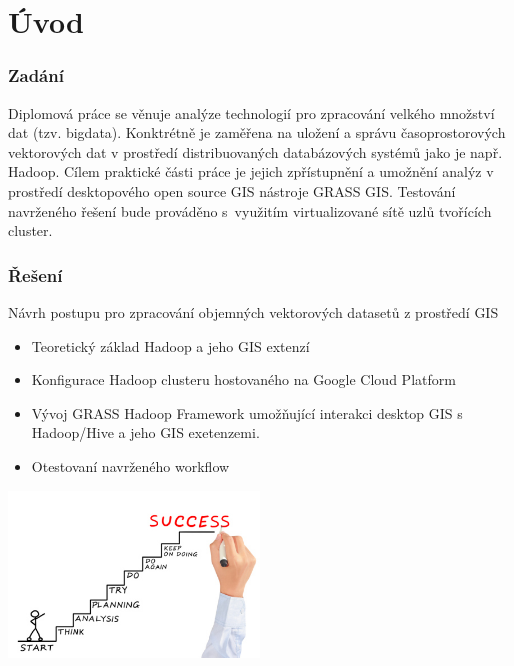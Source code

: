 \documentclass[unicode,bookmarksnumbered]{beamer}
\begin{document}
%

	\section{Úvod}  %
	\begin{frame}
		\frametitle{Zadání}
Diplomová práce se věnuje analýze technologií pro zpracování velkého množství dat (tzv. bigdata). Konktrétně je zaměřena na uložení a správu časoprostorových vektorových dat v prostředí distribuovaných databázových systémů jako je např. Hadoop. Cílem praktické části práce je jejich zpřístupnění a umožnění analýz v prostředí desktopového open source GIS nástroje GRASS GIS. Testování navrženého řešení bude prováděno s využitím virtualizované sítě uzlů tvořících cluster.

	\end{frame}
%

	\begin{frame}
		\frametitle{Řešení}
		Návrh postupu pro zpracování objemných vektorových datasetů z prostředí GIS
		\begin{itemize}
			\item Teoretický základ Hadoop a jeho GIS extenzí
			\item Konfigurace Hadoop clusteru hostovaného na Google Cloud Platform
			\item Vývoj GRASS Hadoop Framework umožňující interakci desktop GIS s Hadoop/Hive a jeho GIS exetenzemi.
			\item Otestovaní navrženého workflow
		\end{itemize}
		\includegraphics[width=0.5\textwidth]{./img/motivace/zadani.jpg}
	\end{frame}
%
\end{document}

